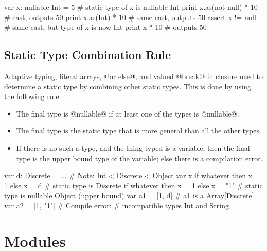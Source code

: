 \begin{lst}
var x: nullable Int = 5 # static type of x is nullable Int
print x.as(not null) * 10 # cast, outputs 50
print x.as(Int) * 10 # same cast, outputs 50
assert x != null # same cast, but type of x is now Int
print x * 10 # outputs 50
\end{lst}

\subsection{Static Type Combination Rule}\label{combination}

Adaptive typing, literal arrays, @or else@, and valued @break@ in closure need to determine a static type by combining other static types.
This is done by using the following rule:
\begin{itemize}
\item The final type is @nullable@ if at least one of the types is @nullable@.
\item The final type is the static type that is more general than all the other types.
\item If there is no such a type, and the thing typed is a variable, then the final type is the upper bound type of the variable; else there is a compilation error.
\end{itemize}

\begin{lst}
var d: Discrete = ...
# Note: Int < Discrete < Object
var x
if whatever then x = 1 else x = d
# static type is Discrete
if whatever then x = 1 else x = "1"
# static type is nullable Object (upper bound)
var a1 = [1, d] # a1 is a Array[Discrete]
var a2 = [1, "1"] # Compile error:
		# incompatible types Int and String 
\end{lst}


\section{Modules}\label{module}

